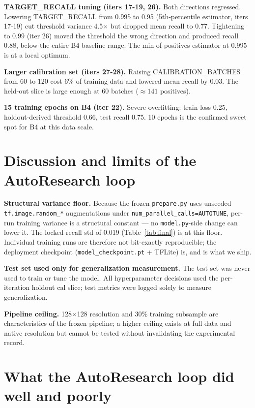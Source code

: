 \documentclass{article}
\begin{document}
\textbf{TARGET\_RECALL tuning (iters 17-19, 26).} Both directions
regressed. Lowering TARGET\_RECALL from 0.995 to 0.95
(5th-percentile estimator, iters 17-19) cut threshold variance 4.5$\times$
but dropped mean recall to 0.77. Tightening to 0.99 (iter 26) moved the
threshold the wrong direction and produced recall 0.88, below the entire
B4 baseline range. The min-of-positives estimator at 0.995 is at a
local optimum.

\textbf{Larger calibration set (iters 27-28).} Raising CALIBRATION\_BATCHES
from 60 to 120 cost 6\% of training data and lowered mean recall by 0.03.
The held-out slice is large enough at 60 batches ($\approx 141$ positives).

\textbf{15 training epochs on B4 (iter 22).} Severe overfitting: train
loss 0.25, holdout-derived threshold 0.66, test recall 0.75. 10 epochs
is the confirmed sweet spot for B4 at this data scale.


\section{Discussion and limits of the AutoResearch loop}
\label{sec:limits}

\textbf{Structural variance floor.} Because the frozen \texttt{prepare.py}
uses unseeded \texttt{tf.image.random\_*} augmentations under
\texttt{num\_parallel\_calls=AUTOTUNE}, per-run training variance is a
structural constant --- no \texttt{model.py}-side change can lower it.
The locked recall std of 0.019 (Table~\ref{tab:final}) is at this floor.
Individual training runs are therefore not bit-exactly reproducible;
the deployment checkpoint (\texttt{model\_checkpoint.pt} + TFLite) is,
and is what we ship.

\textbf{Test set used only for generalization measurement.} The test set
was never used to train or tune the model. All hyperparameter decisions
used the per-iteration holdout cal slice; test metrics were logged solely
to measure generalization.

\textbf{Pipeline ceiling.} 128$\times$128 resolution and 30\% training
subsample are characteristics of the frozen pipeline; a higher ceiling
exists at full data and native resolution but cannot be tested without
invalidating the experimental record.

\section{What the AutoResearch loop did well and poorly}
\end{document}
